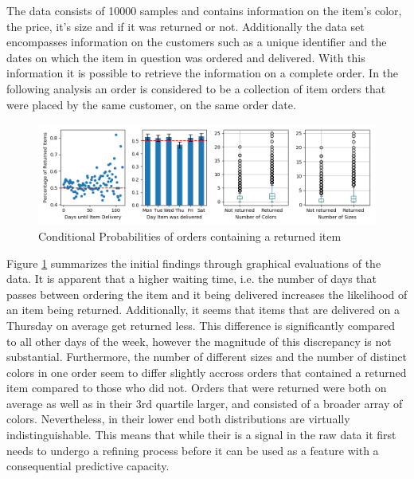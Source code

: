 The data consists of 10000 samples and contains information on the item's color, the price, it's size and if it was returned or not. Additionally the data set encompasses information on the customers such as a unique identifier and the dates on which the item in question was ordered and delivered. With this information it is possible to retrieve the information on a complete order. In the following analysis an order is considered to be a collection of item orders that were placed by the same customer, on the same order date.

\begin{figure}
\centering
\caption{Conditional Probabilities of orders containing a returned item}
\label{exploratory}
\includegraphics[scale=0.45]{../eda/exploratory.png}
\end{figure}

Figure \ref{exploratory} summarizes the initial findings through graphical evaluations of the data. It is apparent that a higher waiting time, i.e. the number of days that passes between ordering the item and it being delivered increases the likelihood of an item being returned. Additionally, it seems that items that are delivered on a Thursday on average get returned less. This difference is significantly compared to all other days of the week, however the magnitude of this discrepancy is not substantial. Furthermore, the number of different sizes and the number of distinct colors in one order seem to differ slightly accross orders that contained a returned item compared to those who did not. Orders that were returned were both on average as well as in their 3rd quartile larger, and consisted of a broader array of colors. Nevertheless, in their lower end both distributions are virtually indistinguishable. This means that while their is a signal in the raw data it first needs to undergo a refining process before it can be used as a feature with a consequential predictive capacity. 



